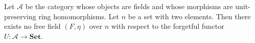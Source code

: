 Let $\mathcal{A}$ be the category whose objects are fields and whose morphisms are unit-preserving ring homomorphisms. Let $n$ be a set with two elements. Then there exists no free field $(F, \eta)$ over $n$ with respect to the forgetful functor $U: \mathcal{A} \longrightarrow \mathbf{Set}$.
